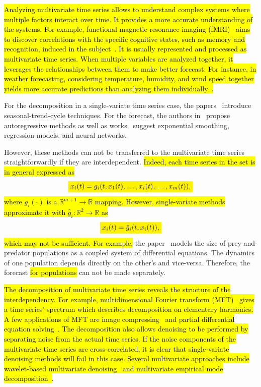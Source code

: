 \documentclass[referee, pdflatex, sn-mathphys-num]{sn-jnl}
\newcommand{\mathcolorbox}[2]{\colorbox{#1}{$\displaystyle #2$}}
\theoremstyle{definition}
\theoremstyle{plain}
\begin{document}
	\hl{Analyzing multivariate time series allows to understand complex systems where multiple factors interact over time. It provides a more accurate understanding of the systems. For example, functional magnetic resonance imaging (fMRI)~{\cite{rinck2018magnetic}} aims to discover correlations with the specific cognitive states, such as memory and recognition, induced in the subject~{\cite{Logothetis2008WhatWC}}. It is usually represented and processed as multivariate time series. When multiple variables are analyzed together, it leverages the relationships between them to make better forecast. For instance, in weather forecasting, considering temperature, humidity, and wind speed together yields more accurate predictions than analyzing them individually~{\cite{weather_forecast}}.} 
	
	For the decomposition in a single-variate time series case, the papers~\cite{enders2010applied, x11, cleveland90} introduce seasonal-trend-cycle techniques. For the forecast, the authors in~\cite{Box_Jenkins_methodology} propose autoregressive methods as well as works~\cite{3b1355aedd1041f1853e609a410576f3, enders2010applied} suggest exponential smoothing, regression models, and neural networks. 
	
	However, these methods can not be transferred to the multivariate time series straightforwardly if they are interdependent. \hl{Indeed, each time series in the set is in general expressed as} \begin{equation*}
		\mathcolorbox{yellow}{x_i(t) = g_i(t, x_1(t), \ldots, x_i(t), \ldots, x_m(t)),}
	\end{equation*}	\hl{where $g_i(\cdot)$ is a $\mathbb{R}^{m + 1} \to \mathbb{R}$ mapping. However, single-variate methods approximate it with $\hat{g}_i: \mathbb{R}^2 \to \mathbb{R}$ as}  \begin{equation*}
		\mathcolorbox{yellow}{x_i(t) = \hat{g}_i(t, x_i(t)),}
	\end{equation*}	\hl{which may not be sufficient. For example,} the paper~\cite{Volterra:1928} models the size of prey-and-predator populations as a coupled system of differential equations. The dynamics of one population depends directly on the other's and vice-versa. Therefore, the forecast \hl{for populations} can not be made separately. 
	
	\hl{The decomposition of multivariate time series reveals the structure of the interdependency. For example, multidimensional Fourier transform (MFT)~{\cite{smith1995handbook}} gives a time series' spectrum which describes decomposition on elementary harmonics. A few applications of MFT are image compressing~{\cite{jpeg}} and partial differential equation solving~{\cite{haberman2013applied}}. The decomposition also allows denoising to be performed  by separating noise from the actual time series. If the noise components of the multivariate time series are cross-correlated, it is clear that single-variate denoising methods will fail in this case. Several multivariate approaches include wavelet-based multivariate denoising~{\cite{wavelet_denoise}} and multivariate empirical mode decomposition~{\cite{HAO2017263}}}.
	
\end{document}
